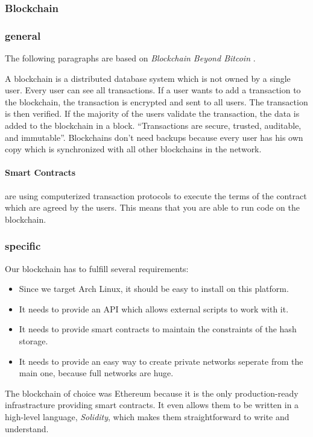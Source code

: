 \subsubsection{Blockchain} \label{sec:blockchain}

\subsubsection*{general}
The following paragraphs are based on \emph{Blockchain Beyond Bitcoin} \cite{Underwood}.

A blockchain is a distributed database system which is not owned by a single user. Every user can see all transactions. If a user wants to add a transaction to the blockchain, the transaction is encrypted and sent to all users. The transaction is then verified. If the majority of the users validate the transaction, the data is added to the blockchain in a block. ``Transactions are secure, trusted, auditable, and immutable''. Blockchains don't need backups because every user has his own copy which is synchronized with all other blockchains in the network. 

\paragraph*{Smart Contracts} are using computerized transaction protocols to execute the terms of the contract which are agreed by the users. This means that you are able to run code on the blockchain. 

\subsubsection*{specific}
Our blockchain has to fulfill several requirements:
\begin{itemize}
	\item Since we target Arch Linux, it should be easy to install on this platform.
	\item It needs to provide an API which allows external scripts to work with it.
	\item It needs to provide smart contracts to maintain the constraints of the hash storage.
	\item It needs to provide an easy way to create private networks seperate from the main one, because full networks are huge.
\end{itemize}

The blockchain of choice was Ethereum because it is the only production-ready infrastracture providing smart contracts. It even allows them to be written in a high-level language, \emph{Solidity}, which makes them straightforward to write and understand.

